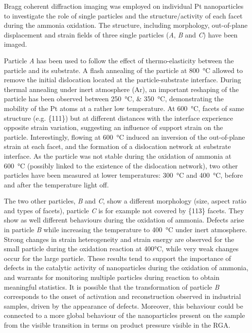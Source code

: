 Bragg coherent diffraction imaging was employed on individual Pt nanoparticles to investigate the role of single particles and the structure/activity of each facet during the ammonia oxidation.
The structure, including morphology, out-of-plane displacement and strain fields of three single particles (\textit{A}, \textit{B} and \textit{C}) have been imaged.

Particle \textit{A} has been used to follow the effect of thermo-elasticity between the particle and its substrate.
A flash annealing of the particle at \qty{800}{\degreeCelsius} allowed to remove the initial dislocation located at the particle-substrate interface.
During thermal annealing under inert atmosphere (Ar), an important reshaping of the particle has been observed between \qtylist{250;350}{\degreeCelsius}, demonstrating the mobility of the Pt atoms at a rather low temperature.
At \qty{600}{\degreeCelsius}, facets of same structure (e.g. \{111\}) but at different distances with the interface experience opposite strain variation, suggesting an influence of support strain on the particle.
Interestingly, flowing  at \qty{600}{\degreeCelsius} induced an inversion of the out-of-plane strain at each facet, and the formation of a dislocation network at substrate interface.
As the particle was not stable during the oxidation of ammonia at \qty{600}{\degreeCelsius} (possibly linked to the existence of the dislocation network), two other particles have been measured at lower temperatures: \qty{300}{\degreeCelsius} and \qty{400}{\degreeCelsius}, before and after the temperature light off.

The two other particles, \textit{B} and \textit{C}, show a different morphology (size, aspect ratio and types of facets), particle \textit{C} is for example not covered by \{113\} facets.
They show as well different behaviours during the oxidation of ammonia.
Defects arise in particle \textit{B} while increasing the temperature to \qty{400}{\degreeCelsius} under inert atmosphere.
Strong changes in strain heterogeneity and strain energy are observed for the small particle during the oxidation reaction at 400°C, while very weak changes occur for the large particle.
These results tend to support the importance of defects in the catalytic activity of nanoparticles during the oxidation of ammonia, and warrants for monitoring multiple particles during reaction to obtain meaningful statistics.
It is possible that the transformation of particle \textit{B} corresponds to the onset of activation and reconstruction observed in industrial samples, driven by the appearance of defects.
Moreover, this behaviour could be connected to a more global behaviour of the nanoparticles present on the sample from the visible transition in terms on product pressure visible in the RGA.

